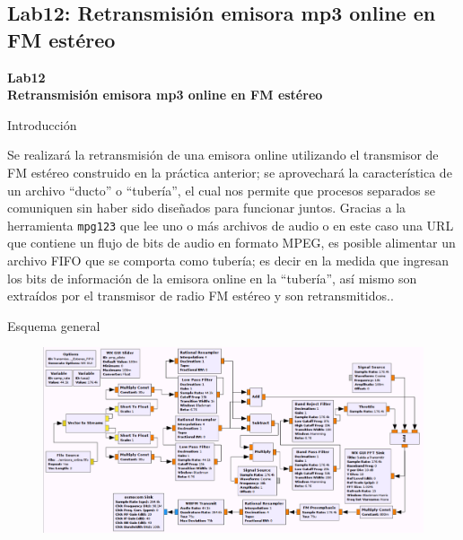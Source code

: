 \subsection{Lab12: Retransmisión emisora mp3 online en FM estéreo}

\begin{frame}{}


\bfseries{\textrm{\LARGE Lab12\\ \Large Retransmisión emisora mp3 \newline online en FM estéreo}}
\raggedright
\end{frame}

\begin{frame}{Introducción}


Se realizará la retransmisión de una emisora online utilizando el transmisor de FM estéreo construido en la práctica anterior; se aprovechará  la característica de un archivo “ducto” o “tubería”, el cual nos permite que procesos separados se comuniquen sin haber sido diseñados para funcionar juntos. Gracias a la herramienta \texttt{mpg123} que lee uno o más archivos de audio o en este caso una URL que contiene un flujo de bits de audio en formato MPEG, es posible alimentar un archivo FIFO que se comporta como tubería; es decir en la medida que ingresan los bits de información de la emisora online en la “tubería”, así mismo son extraídos por el transmisor de radio FM estéreo y son retransmitidos.\cite{linuxjournal1995}.

\end{frame}

\begin{frame}{Esquema general}
    
\begin{figure}[H]
\centering
\vspace{-3mm}
\includegraphics[width=\textwidth]{parte3/lab13/pdf/lab13_1.pdf}
\end{figure}
    
\end{frame}

